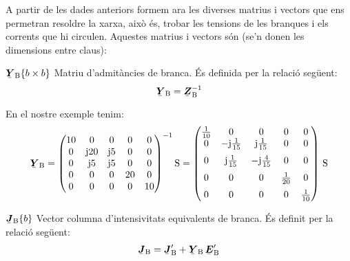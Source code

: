 A partir de les dades anteriors formem ara les diverses matrius i
vectors que ens permetran resoldre la xarxa, això és, trobar les
tensions de les branques i els corrents que hi circulen. Aquestes
matrius i vectors són (se'n donen les dimensions entre claus):

\begin{list}{}
{\setlength{\labelwidth}{20mm} \setlength{\leftmargin}{22mm} \setlength{\labelsep}{2mm}}
   \item[$\mcmplx{Y}\ped{B}\{b\times b\}$] Matriu d'admitàncies de branca. És definida per la relació següent:
   \begin{equation}
      \mcmplx{Y}\ped{B} = \mcmplx{Z}\ped{B}^{-1}
   \end{equation}

   En el nostre exemple tenim:
   \[
      \mcmplx{Y}\ped{B} = \begin{pmatrix}
            10 & 0 & 0 & 0 & 0 \\
            0 & \ju 20 & \ju 5 & 0 & 0 \\
            0 & \ju 5 & \ju 5 & 0 & 0 \\
            0 & 0 & 0 & 20 & 0 \\
            0 & 0 & 0 & 0 & 10
      \end{pmatrix} ^{-1}\unit{S} =
      \begin{pmatrix}
            \frac{1}{10} & 0 & 0 & 0 & 0 \\
            0 & -\ju\frac{1}{15} & \ju\frac{1}{15} & 0 & 0 \\[2mm]
            0 & \ju\frac{1}{15} & -\ju\frac{4}{15} & 0 & 0 \\[2mm]
            0 & 0 & 0 & \frac{1}{20} & 0 \\[2mm]
            0 & 0 & 0 & 0 & \frac{1}{10}
      \end{pmatrix}\,\unit{S}
   \]

   \item[$\mcmplx{J}\ped{B}\{b\}$] Vector columna d'intensivitats  equivalents de branca. És definit per la relació següent:
   \begin{equation}
      \mcmplx{J}\ped{B} = \mcmplx{J}'\ped{B}  + \mcmplx{Y}\ped{B} \,\mcmplx{E}'\ped{B}
   \end{equation}


\end{list}
